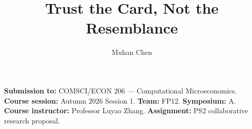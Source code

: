 \documentclass[sigconf,nonacm]{acmart}
\title{Trust the Card, Not the Resemblance}
\author{Muhan Chen}
\affiliation{\institution{Duke Kunshan University}\city{Kunshan}\country{China}}
\newcommand{\CourseNumber}{COMSCI/ECON 206}
\newcommand{\CourseName}{Computational Microeconomics}
\newcommand{\CourseSession}{Autumn 2026 Session 1}
\newcommand{\Instructor}{Professor Luyao Zhang}
\newcommand{\TeamCode}{FP12}
\newcommand{\SymposiumSession}{A}
\newcommand{\coursemeta}{\noindent\textbf{Submission to:} \CourseNumber{} --- \CourseName.\\
\textbf{Course session:} \CourseSession. \textbf{Team:} \TeamCode. \textbf{Symposium:} \SymposiumSession.\\
\textbf{Course instructor:} \Instructor. \textbf{Assignment:} PS2 collaborative research proposal.\par\smallskip}
\begin{document}
\begin{teaserfigure}
\centering

\caption{Three linked panels share one question, the forfeit rule. Completed model evidence is the matrix equilibria, the Nashpy check, and the PS1 replay of $p^\ast=0.6$. Human play is seven pairs: the Trust rise is descriptive and mixed with order; Keep stayed near one half. Interface clicks are not those sessions. Panel colors, also named in the text: Strategy \#0072B2, Interdisciplinary \#009E73, Leadership \#E69F00; arrows and the lower bar use Ink \#111111.}
\label{fig:teaser}
\end{teaserfigure}
\maketitle\raggedbottom\coursemeta


\end{document}
